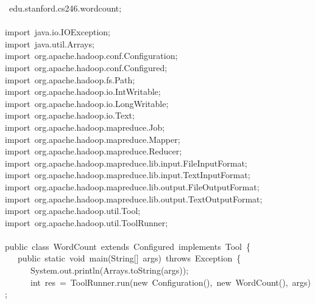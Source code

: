 \documentclass{article}
\begin{document}
\begin{mdpre}%
~edu.stanford.cs246.wordcount;\\
\\
{import}~java.io.IOException;\\
{import}~java.util.Arrays;\\
{import}~org.apache.hadoop.conf.Configuration;\\
{import}~org.apache.hadoop.conf.Configured;\\
{import}~org.apache.hadoop.fs.Path;\\
{import}~org.apache.hadoop.io.IntWritable;\\
{import}~org.apache.hadoop.io.LongWritable;\\
{import}~org.apache.hadoop.io.Text;\\
{import}~org.apache.hadoop.mapreduce.Job;\\
{import}~org.apache.hadoop.mapreduce.Mapper;\\
{import}~org.apache.hadoop.mapreduce.Reducer;\\
{import}~org.apache.hadoop.mapreduce.lib.input.FileInputFormat;\\
{import}~org.apache.hadoop.mapreduce.lib.input.TextInputFormat;\\
{import}~org.apache.hadoop.mapreduce.lib.output.FileOutputFormat;\\
{import}~org.apache.hadoop.mapreduce.lib.output.TextOutputFormat;\\
{import}~org.apache.hadoop.util.Tool;\\
{import}~org.apache.hadoop.util.ToolRunner;\\
\\
{public}~{class}~WordCount~{extends}~Configured~{implements}~Tool~\{\\
~~~{public}~{static}~{void}~main(String{}[]~args)~{throws}~Exception~\{\\
~~~~~~System.out.println(Arrays.{toString}(args));\\
~~~~~~{int}~res~=~ToolRunner.run({new}~Configuration(),~{new}~WordCount(),~args);\\
~~~~~~\\

\end{mdpre}
\end{document}
